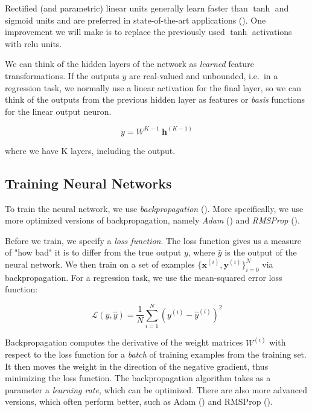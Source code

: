 \documentclass{article}
\newcommand{\citep}[2][]{(\cite[#1]{#2})}
\begin{document}
Rectified (and parametric) linear units generally learn faster than $\tanh$ and sigmoid units and are preferred in state-of-the-art applications \citep{glorot_deep_2011}. One improvement we will make is to replace the previously used $\tanh$ activations with relu units.
\vskip 0.1in

We can think of the hidden layers of the network as \textit{learned} feature transformations. If the outputs $y$ are real-valued and unbounded, i.e.\ in a regression task, we normally use a linear activation for the final layer, so we can think of the outputs from the previous hidden layer as features or \textit{basis} functions for the linear output neuron.

\begin{equation}
    y = W^{{K - 1}}\ \mathbf{h}^{(K - 1)}
\end{equation}

where we have K layers, including the output.

\subsection{Training Neural Networks}
\label{sec:nn_train}

To train the neural network, we use \textit{backpropagation} \citep{rumelhart_learning_1985}. More specifically, we use more optimized versions of backpropagation, namely \textit{Adam} \citep{kingma_adam:_2014} and \textit{RMSProp} \citep{tieleman_t._and_hinton_g._e._lecture_2012}.
\vskip 0.1in

Before we train, we specify a \textit{loss function}. The loss function gives us a measure of "how bad" it is to differ from the true output $y$, where $\hat{y}$ is the output of the neural network. We then train on a set of examples $\{\mathbf{x}^{(i)}, \mathbf{y}^{(i)}\}_{i = 0}^{N}$ via backpropagation. For a regression task, we use the mean-squared error loss function:

\begin{equation}
    \mathcal{L}(y, \hat{y}) = \frac{1}{N} \sum_{i = 1}^{N} (y^{(i)} - \hat{y}^{(i)})^2
\end{equation}

Backpropagation computes the derivative of the weight matrices $W^{(i)}$ with respect to the loss function for a \textit{batch} of training examples from the training set. It then moves the weight in the direction of the negative gradient, thus minimizing the loss function. The backpropagation algorithm takes as a parameter a \textit{learning rate}, which can be optimized. There are also more advanced versions, which often perform better, such as Adam \citep{kingma_adam:_2014} and RMSProp \citep{tieleman_t._and_hinton_g._e._lecture_2012}.
\end{document}
